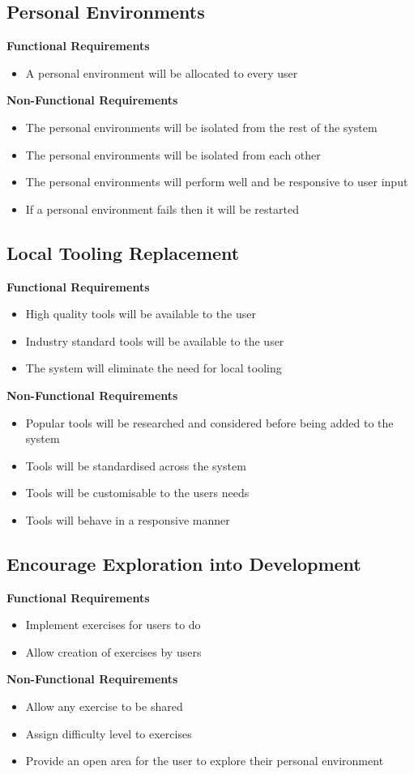 \subsection{Personal Environments}
\textbf{Functional Requirements}
\begin{itemize}
    \item A personal environment will be allocated to every user
\end{itemize}
\textbf{Non-Functional Requirements}
\begin{itemize}
    \item The personal environments will be isolated from the rest of the system
    \item The personal environments will be isolated from each other
    \item The personal environments will perform well and be responsive to user input
    \item If a personal environment fails then it will be restarted
\end{itemize}

\subsection{Local Tooling Replacement}
\textbf{Functional Requirements}
\begin{itemize}
    \item High quality tools will be available to the user
    \item Industry standard tools will be available to the user
    \item The system will eliminate the need for local tooling
\end{itemize}
\textbf{Non-Functional Requirements}
\begin{itemize}
    \item Popular tools will be researched and considered before being added to the system
    \item Tools will be standardised across the system
    \item Tools will be customisable to the users needs
    \item Tools will behave in a responsive manner
\end{itemize}

\subsection{Encourage Exploration into Development}
\textbf{Functional Requirements}
\begin{itemize}
    \item Implement exercises for users to do
    \item Allow creation of exercises by users
\end{itemize}
\textbf{Non-Functional Requirements}
\begin{itemize}
    \item Allow any exercise to be shared
    \item Assign difficulty level to exercises
    \item Provide an open area for the user to explore their personal environment
\end{itemize}
